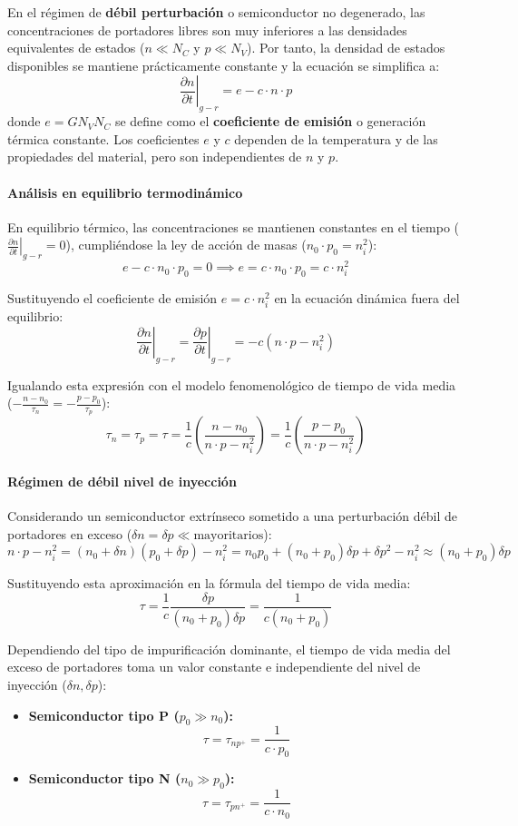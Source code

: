 En el régimen de \textbf{débil perturbación} o semiconductor no degenerado, las concentraciones de portadores libres son muy inferiores a las densidades equivalentes de estados ($n \ll N_C$ y $p \ll N_V$). Por tanto, la densidad de estados disponibles se mantiene prácticamente constante y la ecuación se simplifica a:
\[
\left. \frac{\partial n}{\partial t} \right|_{g-r} = e - c \cdot n \cdot p
\]
donde $e = G N_V N_C$ se define como el \textbf{coeficiente de emisión} o generación térmica constante. Los coeficientes $e$ y $c$ dependen de la temperatura y de las propiedades del material, pero son independientes de $n$ y $p$.

\paragraph{Análisis en equilibrio termodinámico}
En equilibrio térmico, las concentraciones se mantienen constantes en el tiempo ($\left. \frac{\partial n}{\partial t} \right|_{g-r} = 0$), cumpliéndose la ley de acción de masas ($n_0 \cdot p_0 = n_i^2$):
\[
e - c \cdot n_0 \cdot p_0 = 0 \implies e = c \cdot n_0 \cdot p_0 = c \cdot n_i^2
\]

Sustituyendo el coeficiente de emisión $e = c \cdot n_i^2$ en la ecuación dinámica fuera del equilibrio:
\[
\left. \frac{\partial n}{\partial t} \right|_{g-r} = \left. \frac{\partial p}{\partial t} \right|_{g-r} = -c (n \cdot p - n_i^2)
\]

Igualando esta expresión con el modelo fenomenológico de tiempo de vida media ($-\frac{n - n_0}{\tau_n} = -\frac{p - p_0}{\tau_p}$):
\[
\tau_n = \tau_p = \tau = \frac{1}{c} \left( \frac{n - n_0}{n \cdot p - n_i^2} \right) = \frac{1}{c} \left( \frac{p - p_0}{n \cdot p - n_i^2} \right)
\]

\paragraph{Régimen de débil nivel de inyección}
Considerando un semiconductor extrínseco sometido a una perturbación débil de portadores en exceso ($\delta n = \delta p \ll \text{mayoritarios}$):
\[
n \cdot p - n_i^2 = (n_0 + \delta n)(p_0 + \delta p) - n_i^2 = n_0 p_0 + (n_0 + p_0)\delta p + \delta p^2 - n_i^2 \approx (n_0 + p_0)\delta p
\]

Sustituyendo esta aproximación en la fórmula del tiempo de vida media:
\[
\tau = \frac{1}{c} \frac{\delta p}{(n_0 + p_0)\delta p} = \frac{1}{c (n_0 + p_0)}
\]

Dependiendo del tipo de impurificación dominante, el tiempo de vida media del exceso de portadores toma un valor constante e independiente del nivel de inyección ($\delta n, \delta p$):
\begin{itemize}
    \item \textbf{Semiconductor tipo P ($p_0 \gg n_0$):}
    \[
    \tau = \tau_{np^+} = \frac{1}{c \cdot p_0}
    \]
    \item \textbf{Semiconductor tipo N ($n_0 \gg p_0$):}
    \[
    \tau = \tau_{pn^+} = \frac{1}{c \cdot n_0}
    \]
\end{itemize}

